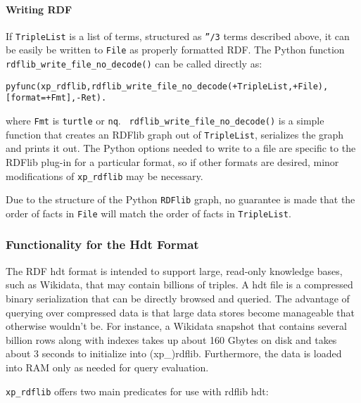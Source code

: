 \paragraph{Writing RDF}

If {\tt TripleList} is a list of terms, structured as {\tt ''/3} terms
described above, it can be easily be written to {\tt File} as properly
formatted RDF.  The Python function {\tt
  rdflib\_write\_file\_no\_decode()} can be called directly as:
\begin{verbatim}
pyfunc(xp_rdflib,rdflib_write_file_no_decode(+TripleList,+File),[format=+Fmt],-Ret).
\end{verbatim}
where {\tt Fmt} is {\tt turtle} or {\tt nq}.  {\tt
  rdflib\_write\_file\_no\_decode()} is a simple function that creates
an RDFlib graph out of {\tt TripleList}, serializes the graph and
prints it out.  The Python options needed to write to a file are
specific to the RDFlib plug-in for a particular format, so if other
formats are desired, minor modifications of {\tt xp\_rdflib} may be
necessary.

Due to the structure of the Python {\tt RDFlib} graph, no guarantee is
made that the order of facts in {\tt File} will match the order of
facts in {\tt TripleList}.
  
\subsubsection{Functionality for the Hdt Format}

The RDF hdt format is intended to support large, read-only knowledge
bases, such as Wikidata, that may contain billions of triples.  A hdt
file is a compressed binary serialization that can be directly browsed
and queried.  The advantage of querying over compressed data is that
large data stores become manageable that otherwise wouldn't be.  For
instance, a Wikidata snapshot that contains several billion rows along
with indexes takes up about 160 Gbytes on disk and takes about 3
seconds to initialize into (xp\_)rdflib.  Furthermore, the data is
loaded into RAM only as needed for query evaluation.  

{\tt xp\_rdflib} offers two main predicates for use with rdflib hdt:

